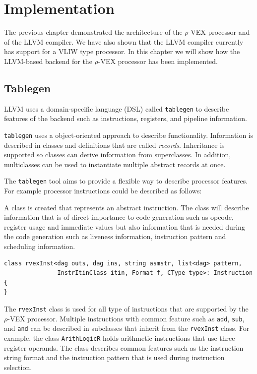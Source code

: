 \chapter{Implementation}
\label{chap:implementation}
The previous chapter demonstrated the architecture of the $\rho$-VEX processor and of the LLVM compiler. We have also shown that the LLVM compiler currently has support for a VLIW type processor. In this chapter we will show how the LLVM-based backend for the $\rho$-VEX processor has been implemented.

\section{Tablegen}
LLVM uses a domain-specific language (DSL) called \texttt{tablegen} to describe features of the backend such as instructions, registers, and pipeline information. 

\texttt{tablegen} uses a object-oriented approach to describe functionality. Information is described in classes and definitions that are called \emph{records}. Inheritance is supported so classes can derive information from superclasses. In addition, multiclasses can be used to instantiate multiple abstract records at once.

The \texttt{tablegen} tool aims to provide a flexible way to describe processor features. For example processor instructions could be described as follows:

A class is created that represents an abstract instruction. The class will describe information that is of direct importance to code generation such as opcode, register usage and immediate values but also information that is needed during the code generation such as liveness information, instruction pattern and scheduling information.

\begin{lstlisting}[language=tblgen]
class rvexInst<dag outs, dag ins, string asmstr, list<dag> pattern,
               InstrItinClass itin, Format f, CType type>: Instruction
{
}
\end{lstlisting}

The \texttt{rvexInst} class is used for all type of instructions that are supported by the $\rho$-VEX processor. Multiple instructions with common feature such as \texttt{add}, \texttt{sub}, and \texttt{and} can be described in subclasses that inherit from the \texttt{rvexInst} class. For example, the class \texttt{ArithLogicR} holds arithmetic instructions that use three register operands. The class describes common features such as the instruction string format and the instruction pattern that is used during instruction selection.

